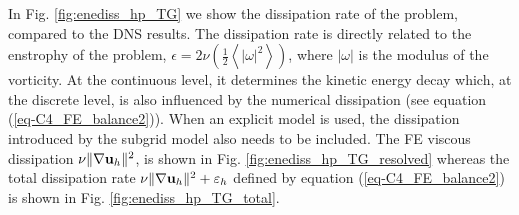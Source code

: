 

In Fig. \ref{fig:enediss_hp_TG} we show the dissipation rate of the problem, compared to the DNS results. The dissipation rate is directly related to the enstrophy of the problem, $\epsilon = 2\nu\left(\frac{1}{2}\left\langle|\omega|^2\right\rangle\right)$, where $|\omega|$ is the modulus of the vorticity. At the continuous level, it determines the kinetic energy decay which, at the discrete level, is also influenced by the numerical dissipation (see equation (\ref{eq-C4_FE_balance2})). When an explicit model is used, the dissipation introduced by the subgrid model also needs to be included. The FE viscous dissipation $\nu\|\nabla{\bf u}_h\|^2$, is shown in Fig. \ref{fig:enediss_hp_TG_resolved} whereas the total dissipation rate $ \nu\|\nabla{\bf u}_h\|^2 + \varepsilon_{h}$ defined by equation (\ref{eq-C4_FE_balance2}) is shown in Fig. \ref{fig:enediss_hp_TG_total}. 



